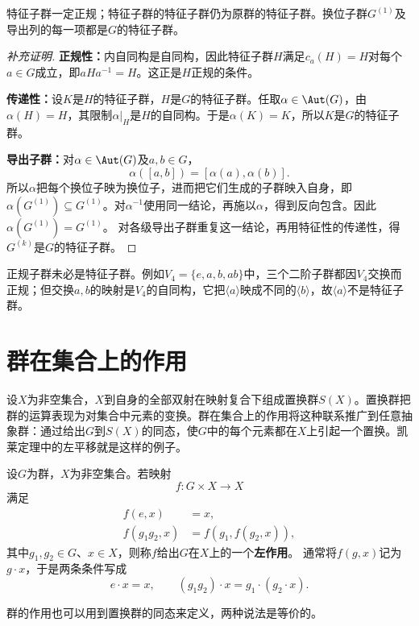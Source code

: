 \begin{proposition}
特征子群一定正规；特征子群的特征子群仍为原群的特征子群。换位子群$G^{(1)}$及导出列的每一项都是$G$的特征子群。
\end{proposition}
\begin{proof}[补充证明]
\textbf{正规性：}内自同构是自同构，因此特征子群$H$满足$c_a(H)=H$对每个$a\in G$成立，即$aHa^{-1}=H$。这正是$H$正规的条件。

\textbf{传递性：}设$K$是$H$的特征子群，$H$是$G$的特征子群。任取$\alpha\in\Aut(G)$，由$\alpha(H)=H$，其限制$\alpha|_H$是$H$的自同构。于是$\alpha(K)=K$，所以$K$是$G$的特征子群。

\textbf{导出子群：}对$\alpha\in\Aut(G)$及$a,b\in G$，
\[
\alpha([a,b])=[\alpha(a),\alpha(b)].
\]
所以$\alpha$把每个换位子映为换位子，进而把它们生成的子群映入自身，即$\alpha(G^{(1)})\subseteq G^{(1)}$。对$\alpha^{-1}$使用同一结论，再施以$\alpha$，得到反向包含。因此$\alpha(G^{(1)})=G^{(1)}$。
对各级导出子群重复这一结论，再用特征性的传递性，得$G^{(k)}$是$G$的特征子群。
\end{proof}

正规子群未必是特征子群。例如$V_4=\{e,a,b,ab\}$中，三个二阶子群都因$V_4$交换而正规；但交换$a,b$的映射是$V_4$的自同构，它把$\langle a\rangle$映成不同的$\langle b\rangle$，故$\langle a\rangle$不是特征子群。

\section{群在集合上的作用}

设$X$为非空集合，$X$到自身的全部双射在映射复合下组成置换群$S(X)$。置换群把群的运算表现为对集合中元素的变换。群在集合上的作用将这种联系推广到任意抽象群：通过给出$G$到$S(X)$的同态，使$G$中的每个元素都在$X$上引起一个置换。凯莱定理中的左平移就是这样的例子。

\begin{definition}
设$G$为群，$X$为非空集合。若映射
\[
f:G\times X\longrightarrow X
\]
满足
\begin{align*}
f(e,x)&=x,\\
f(g_1g_2,x)&=f(g_1,f(g_2,x)),
\end{align*}
其中$g_1,g_2\in G$、$x\in X$，则称$f$给出$G$在$X$上的一个\textbf{左作用}。
通常将$f(g,x)$记为$g\cdot x$，于是两条条件写成
\[
e\cdot x=x,\qquad(g_1g_2)\cdot x=g_1\cdot(g_2\cdot x).
\]
\end{definition}

群的作用也可以用到置换群的同态来定义，两种说法是等价的。

